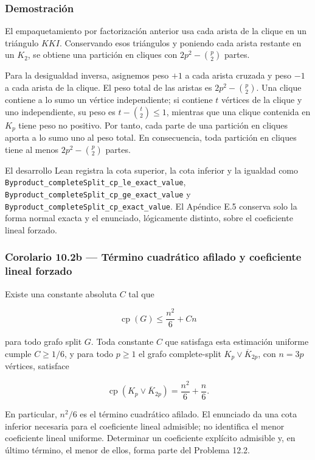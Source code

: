 \documentclass[
  spanish,
  11pt,
  a4paper,
]{article}
\begin{document}
\subsubsection{Demostración}\label{demostraciuxf3n-6}

El empaquetamiento por factorización anterior usa cada arista de la clique en un triángulo \(KKI\). Conservando esos triángulos y poniendo cada arista restante en un \(K_2\), se obtiene una partición en cliques con \(2p^2-\binom p2\) partes.

Para la desigualdad inversa, asignemos peso \(+1\) a cada arista cruzada y peso \(-1\) a cada arista de la clique. El peso total de las aristas es \(2p^2-\binom p2\). Una clique contiene a lo sumo un vértice independiente; si contiene \(t\) vértices de la clique y uno independiente, su peso es \(t-\binom t2\le1\), mientras que una clique contenida en \(K_p\) tiene peso no positivo. Por tanto, cada parte de una partición en cliques aporta a lo sumo uno al peso total. En consecuencia, toda partición en cliques tiene al menos \(2p^2-\binom p2\) partes.

El desarrollo Lean registra la cota superior, la cota inferior y la igualdad como \texttt{Byproduct\_completeSplit\_cp\_le\_exact\_value}, \texttt{Byproduct\_completeSplit\_cp\_ge\_exact\_value} y \texttt{Byproduct\_completeSplit\_cp\_exact\_value}. El Apéndice E.5 conserva solo la forma normal exacta y el enunciado, lógicamente distinto, sobre el coeficiente lineal forzado.

\subsubsection{Corolario 10.2b --- Término cuadrático afilado y coeficiente lineal forzado}\label{corolario-10.2b-tuxe9rmino-cuadruxe1tico-afilado-y-coeficiente-lineal-forzado}

Existe una constante absoluta \(C\) tal que

\[
\operatorname{cp}(G)\le \frac{n^2}{6}+Cn
\]

para todo grafo split \(G\). Toda constante \(C\) que satisfaga esta estimación uniforme cumple \(C\ge1/6\), y para todo \(p\ge1\) el grafo complete-split \(K_p\vee\overline K_{2p}\), con \(n=3p\) vértices, satisface

\[
\operatorname{cp}\!\left(K_p\vee\overline K_{2p}\right)
=\frac{n^2}{6}+\frac n6.
\]

En particular, \(n^2/6\) es el término cuadrático afilado. El enunciado da una cota inferior necesaria para el coeficiente lineal admisible; no identifica el menor coeficiente lineal uniforme. Determinar un coeficiente explícito admisible y, en último término, el menor de ellos, forma parte del Problema 12.2.
\end{document}

